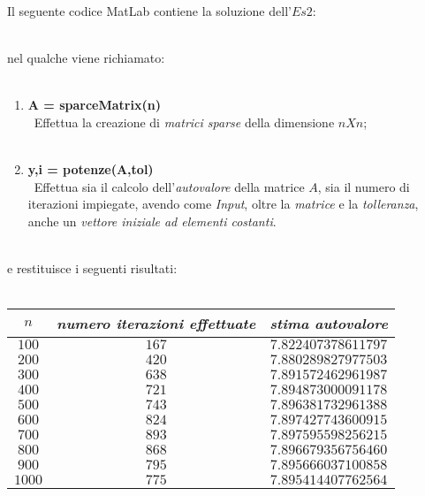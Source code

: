Il seguente codice MatLab contiene la soluzione dell'$Es 2$:\\\
	
nel qualche viene richiamato:\\\
	\begin{enumerate}
		\item \textbf{A = sparceMatrix(n)}\\\
			Effettua la creazione di \textit{matrici sparse} della dimensione $nXn$;\\\
		\item \textbf{y,i = potenze(A,tol)}\\\
			Effettua sia il calcolo dell'\textit{autovalore} della matrice $A$, sia il numero di iterazioni impiegate, avendo come \textit{Input}, oltre la 	\textit{matrice} e la \textit{tolleranza}, anche un \textit{vettore iniziale ad elementi costanti}.\\\
				
	\end{enumerate}
e restituisce i seguenti risultati:\\\
	\begin{center}
		\begin{tabular}{|c|c|c|}
			\hline
				$n$ & \textit{numero iterazioni effettuate} & \textit{stima autovalore} \\
			\hline
				$100$ & $167$ & $7.822407378611797$ \\
				$200$ & $420$ & $7.880289827977503$ \\
				$300$ & $638$ & $7.891572462961987$ \\
				$400$ & $721$ & $7.894873000091178$ \\
				$500$ & $743$ & $7.896381732961388$ \\
				$600$ & $824$ & $7.897427743600915$ \\
				$700$ & $893$ & $7.897595598256215$ \\
				$800$ & $868$ & $7.896679356756460$ \\
				$900$ & $795$ & $7.895666037100858$ \\
				$1000$ & $775$ & $7.895414407762564$ \\
			\hline 
		\end{tabular}
	\end{center}